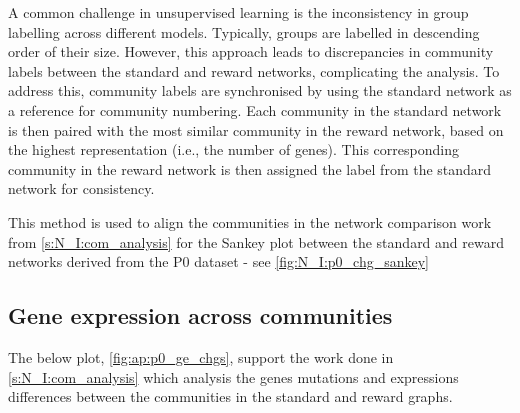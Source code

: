 A common challenge in unsupervised learning is the inconsistency in group labelling across different models. Typically, groups are labelled in descending order of their size. However, this approach leads to discrepancies in community labels between the standard and reward networks, complicating the analysis. To address this, community labels are synchronised by using the standard network as a reference for community numbering. Each community in the standard network is then paired with the most similar community in the reward network, based on the highest representation (i.e., the number of genes). This corresponding community in the reward network is then assigned the label from the standard network for consistency.

This method is used to align the communities in the network comparison work from \cref{s:N_I:com_analysis} for the Sankey plot between the standard and reward networks derived from the P0 dataset - see \cref{fig:N_I:p0_chg_sankey}


\subsection{Gene expression across communities} \label{s:ap:ge_p0_com}

The below plot, \cref{fig:ap:p0_ge_chgs}, support the work done in \cref{s:N_I:com_analysis} which analysis the genes mutations and expressions differences between the communities in the standard and reward graphs.

